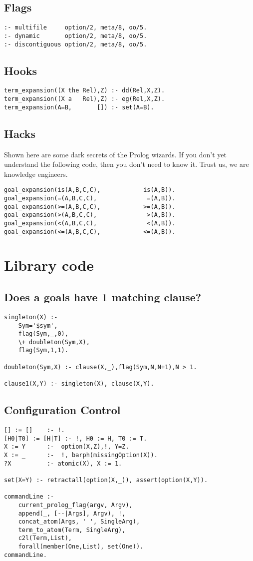 \documentclass[twocolumn,global]{svjour}
\begin{document}
\subsection{ Flags }\begin{Verbatim}
:- multifile     option/2, meta/8, oo/5.
:- dynamic       option/2, meta/8, oo/5.
:- discontiguous option/2, meta/8, oo/5.
\end{Verbatim}
\subsection{ Hooks }\begin{Verbatim}
term_expansion((X the Rel),Z) :- dd(Rel,X,Z).
term_expansion((X a   Rel),Z) :- eg(Rel,X,Z).
term_expansion(A=B,       []) :- set(A=B).
\end{Verbatim}
\subsection{ Hacks
}
 Shown here are some dark secrets of the Prolog
wizards. If you don't yet understand
the following code,
then you don't need to know it. Trust us,
we are knowledge engineers.  \begin{Verbatim}
goal_expansion(is(A,B,C,C),            is(A,B)).
goal_expansion(=(A,B,C,C),              =(A,B)).
goal_expansion(>=(A,B,C,C),            >=(A,B)).
goal_expansion(>(A,B,C,C),              >(A,B)).
goal_expansion(<(A,B,C,C),              <(A,B)).
goal_expansion(<=(A,B,C,C),            <=(A,B)).
\end{Verbatim}
\section{ Library code
}
\subsection{ Does a goals have 1 matching clause? }\begin{Verbatim}
singleton(X) :-
    Sym='$sym',
    flag(Sym,_,0),
    \+ doubleton(Sym,X),
    flag(Sym,1,1).

doubleton(Sym,X) :- clause(X,_),flag(Sym,N,N+1),N > 1.

clause1(X,Y) :- singleton(X), clause(X,Y).
\end{Verbatim}
\subsection{ Configuration Control }\begin{Verbatim}
[] := []    :- !.
[H0|T0] := [H|T] :- !, H0 := H, T0 := T.
X := Y      :-  option(X,Z),!, Y=Z.
X := _      :-  !, barph(missingOption(X)).
?X          :- atomic(X), X := 1.

set(X=Y) :- retractall(option(X,_)), assert(option(X,Y)).

commandLine :-
    current_prolog_flag(argv, Argv),
    append(_, [--|Args], Argv), !,
    concat_atom(Args, ' ', SingleArg),
    term_to_atom(Term, SingleArg),
    c2l(Term,List),
    forall(member(One,List), set(One)).
commandLine.
\end{Verbatim}
\end{document}
